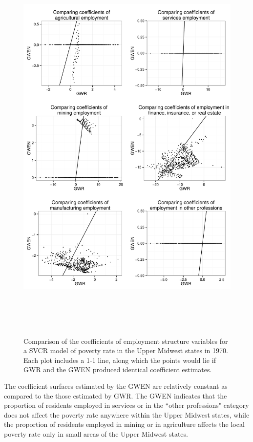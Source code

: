 \documentclass[authoryear, review, 11pt]{elsarticle}
\begin{document}
	\begin{figure}
		\begin{center}
			\includegraphics[height=8in]{../../figures/poverty/1970-GWEN-GWR-comparison}
			\caption{Comparison of the coefficients of employment structure variables for a SVCR model of poverty rate in the Upper Midwest states in 1970. Each plot includes a 1-1 line, along which the points would lie if GWR and the GWEN produced identical coefficient estimates. \label{fig:gwen-gwr-comparison-1970}}
		\end{center}
	\end{figure}
			
	The coefficient surfaces estimated by the GWEN are relatively constant as compared to the those estimated by GWR. The GWEN indicates that the proportion of residents employed in services or in the ``other professions" category does not affect the poverty rate anywhere within the Upper Midwest states, while the proportion of residents employed in mining or in agriculture affects the local poverty rate only in small areas of the Upper Midwest states.
\end{document}
